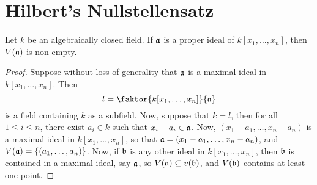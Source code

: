 \section{Hilbert's Nullstellensatz}\label{section_10.7}

\begin{proposition}\label{proposition_10.5.1}
  Let $k$ be an algebraically closed field. If $\af$ is a proper ideal
  of $k[x_1, \dots, x_n]$, then $V(\af)$ is non-empty.
\end{proposition}
\begin{proof}
  Suppose without loss of generality that $\af$ is a maximal ideal in
   $k[x_1, \dots, x_n]$. Then
   \begin{equation*}
     l=\faktor{k[x_1, \dots, x_n]}{\af}
   \end{equation*}
   is a field containing $k$ as a subfield. Now, suppose that $k=l$,
   then for all  $1 \leq i \leq n$, there exist $a_i \in k$ such that
   $x_i-a_i \in \af$. Now, $(x_1-a_1, \dots, x_n-a_n)$ is a maximal
   ideal in $k[x_1, \dots, x_n]$, so that $\af=(x_1-a_1, \dots, x_n-a_n)$,
   and $V(\af)=\{(a_1, \dots, a_n)\}$. Now, if $\bf$ is any other
   ideal in $k[x_1,\dots,x_n]$, then $\bf$ is contained in a maximal
   ideal, say $\af$, so $V(\af) \subseteq v(\bf)$, and $V(\bf)$
   contains at-least one point.
\end{proof}

